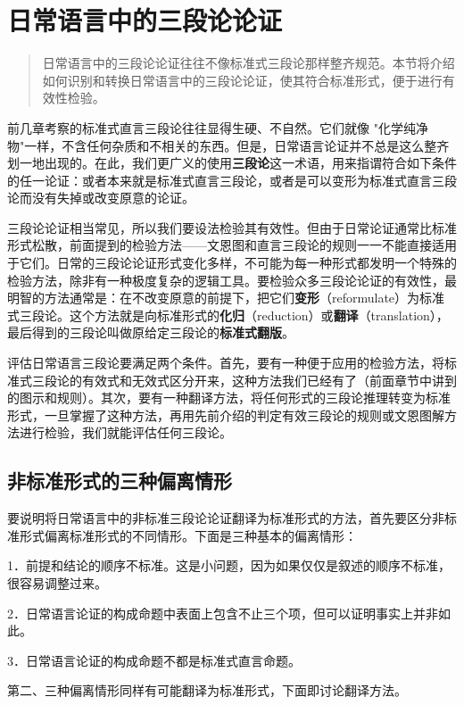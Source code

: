 \section{日常语言中的三段论论证}

\begin{quotation}
日常语言中的三段论论证往往不像标准式三段论那样整齐规范。本节将介绍如何识别和转换日常语言中的三段论论证，使其符合标准形式，便于进行有效性检验。
\end{quotation}

前几章考察的标准式直言三段论往往显得生硬、不自然。它们就像 "化学纯净物"一样，不含任何杂质和不相关的东西。但是，日常语言论证并不总是这么整齐划一地出现的。在此，我们更广义的使用\textbf{三段论}这一术语，用来指谓符合如下条件的任一论证：或者本来就是标准式直言三段论，或者是可以变形为标准式直言三段论而没有失掉或改变原意的论证。

三段论论证相当常见，所以我们要设法检验其有效性。但由于日常论证通常比标准形式松散，前面提到的检验方法——文恩图和直言三段论的规则一一不能直接适用于它们。日常的三段论论证形式变化多样，不可能为每一种形式都发明一个特殊的检验方法，除非有一种极度复杂的逻辑工具。要检验众多三段论论证的有效性，最明智的方法通常是：在不改变原意的前提下，把它们\textbf{变形}（reformulate）为标准式三段论。这个方法就是向标准形式的\textbf{化归}（reduction）或\textbf{翻译}（translation），最后得到的三段论叫做原给定三段论的\textbf{标准式翻版}。

评估日常语言三段论要满足两个条件。首先，要有一种便于应用的检验方法，将标准式三段论的有效式和无效式区分开来，这种方法我们已经有了（前面章节中讲到的图示和规则）。其次，要有一种翻译方法，将任何形式的三段论推理转变为标准形式，一旦掌握了这种方法，再用先前介绍的判定有效三段论的规则或文恩图解方法进行检验，我们就能评估任何三段论。

\subsection{非标准形式的三种偏离情形}

要说明将日常语言中的非标准三段论论证翻译为标准形式的方法，首先要区分非标准形式偏离标准形式的不同情形。下面是三种基本的偏离情形：

1．前提和结论的顺序不标准。这是小问题，因为如果仅仅是叙述的顺序不标准，很容易调整过来。

2．日常语言论证的构成命题中表面上包含不止三个项，但可以证明事实上并非如此。

3．日常语言论证的构成命题不都是标准式直言命题。

第二、三种偏离情形同样有可能翻译为标准形式，下面即讨论翻译方法。

